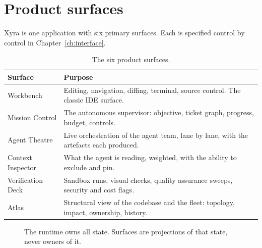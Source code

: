 \section{Product surfaces}

Xyra is one application with six primary surfaces. Each is specified control by control in
Chapter~\ref{ch:interface}.

\begin{table}[h]
\centering
\small
\begin{tabularx}{\textwidth}{l X}
\toprule
\textbf{Surface} & \textbf{Purpose} \\
\midrule
Workbench & Editing, navigation, diffing, terminal, source control. The classic IDE surface. \\
Mission Control & The autonomous supervisor: objective, ticket graph, progress, budget, controls. \\
Agent Theatre & Live orchestration of the agent team, lane by lane, with the artefacts each produced. \\
Context Inspector & What the agent is reading, weighted, with the ability to exclude and pin. \\
Verification Deck & Sandbox runs, visual checks, quality assurance sweeps, security and cost flags. \\
Atlas & Structural view of the codebase and the fleet: topology, impact, ownership, history. \\
\bottomrule
\end{tabularx}
\caption{The six product surfaces.}
\end{table}

\begin{figure}[h]
\centering
{}
\caption{The runtime owns all state. Surfaces are projections of that state, never owners of it.}
\end{figure}

